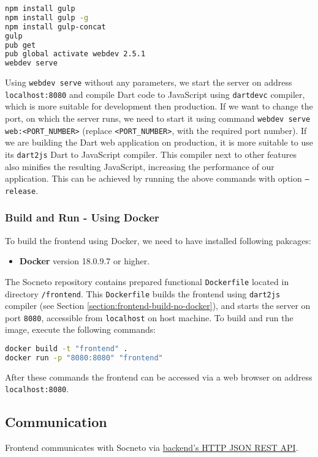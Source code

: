 \begin{lstlisting}[language=bash]
npm install gulp
npm install gulp -g
npm install gulp-concat
gulp
pub get
pub global activate webdev 2.5.1
webdev serve
\end{lstlisting}

Using \texttt{webdev serve} without any parameters, we start the server on address \texttt{localhost:8080} and compile Dart code to JavaScript using \texttt{dartdevc} compiler, which is more suitable for development then production. If we want to change the port, on which the server runs, we need to start it using command \texttt{webdev serve web:<PORT\_NUMBER>} (replace \texttt{<PORT\_NUMBER>}, with the required port number). If we are building the Dart web application on production, it is more suitable to use its \texttt{dart2js} Dart to JavaScript compiler. This compiler next to other features also minifies the resulting JavaScript, increasing the performance of our application. This can be achieved by running the above commands with option \texttt{--release}. 

\subsubsection {Build and Run - Using Docker}
To build the frontend using Docker, we need to have installed following pakcages:
\begin{itemize}
    \item \textbf{Docker} version 18.0.9.7 or higher.
\end{itemize}

The Socneto repository contains prepared functional \texttt{Dockerfile} located in directory \texttt{/frontend}. This \texttt{Dockerfile} builds the frontend using \texttt{dart2js} compiler (see Section \ref{section:frontend-build-no-docker}), and starts the server on port \texttt{8080}, accessible from \texttt{localhost} on host machine. To build and run the image, execute the following commands:

\begin{lstlisting}[language=bash]
docker build -t "frontend" .
docker run -p "8080:8080" "frontend"
\end{lstlisting}

After these commands the frontend can be accessed via a web browser on address \texttt{localhost:8080}.

\subsection{Communication}

Frontend communicates with Socneto via \href{section:backend-communication}{backend's HTTP JSON REST API}. 